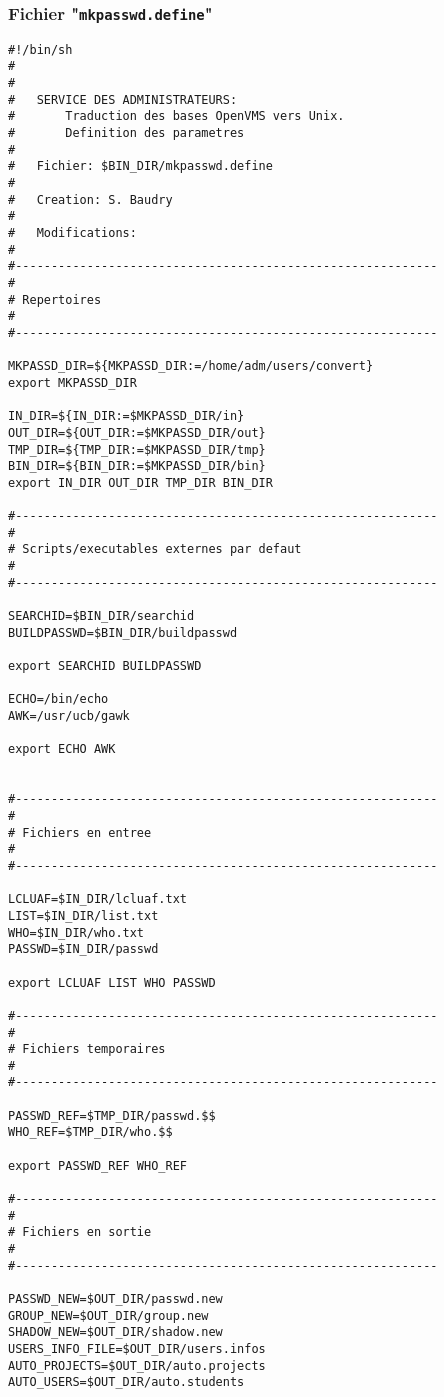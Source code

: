\subsubsection{\texorpdfstring{\label{adv-programming-ex3-pgmdef}Fichier "{\tt mkpasswd.define}"}{Fichier "mkpasswd.define"}}

\begin{verbatim}
#!/bin/sh
#
#
#   SERVICE DES ADMINISTRATEURS:
#       Traduction des bases OpenVMS vers Unix.
#       Definition des parametres
#
#   Fichier: $BIN_DIR/mkpasswd.define
#
#   Creation: S. Baudry
#
#   Modifications:
#
#-----------------------------------------------------------
#
# Repertoires
#
#-----------------------------------------------------------

MKPASSD_DIR=${MKPASSD_DIR:=/home/adm/users/convert}
export MKPASSD_DIR

IN_DIR=${IN_DIR:=$MKPASSD_DIR/in}
OUT_DIR=${OUT_DIR:=$MKPASSD_DIR/out}
TMP_DIR=${TMP_DIR:=$MKPASSD_DIR/tmp}
BIN_DIR=${BIN_DIR:=$MKPASSD_DIR/bin}
export IN_DIR OUT_DIR TMP_DIR BIN_DIR

#-----------------------------------------------------------
#
# Scripts/executables externes par defaut
#
#-----------------------------------------------------------

SEARCHID=$BIN_DIR/searchid
BUILDPASSWD=$BIN_DIR/buildpasswd

export SEARCHID BUILDPASSWD

ECHO=/bin/echo
AWK=/usr/ucb/gawk

export ECHO AWK


#-----------------------------------------------------------
#
# Fichiers en entree
#
#-----------------------------------------------------------

LCLUAF=$IN_DIR/lcluaf.txt
LIST=$IN_DIR/list.txt
WHO=$IN_DIR/who.txt
PASSWD=$IN_DIR/passwd

export LCLUAF LIST WHO PASSWD

#-----------------------------------------------------------
#
# Fichiers temporaires
#
#-----------------------------------------------------------

PASSWD_REF=$TMP_DIR/passwd.$$
WHO_REF=$TMP_DIR/who.$$

export PASSWD_REF WHO_REF

#-----------------------------------------------------------
#
# Fichiers en sortie
#
#-----------------------------------------------------------

PASSWD_NEW=$OUT_DIR/passwd.new
GROUP_NEW=$OUT_DIR/group.new
SHADOW_NEW=$OUT_DIR/shadow.new
USERS_INFO_FILE=$OUT_DIR/users.infos
AUTO_PROJECTS=$OUT_DIR/auto.projects
AUTO_USERS=$OUT_DIR/auto.students


\end{verbatim}
